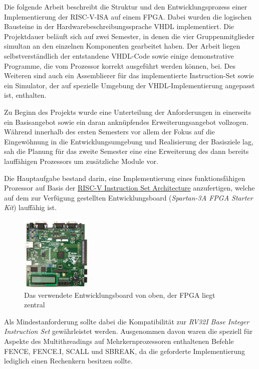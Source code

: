 
Die folgende Arbeit beschreibt die Struktur und den Entwicklungsprozess einer Implementierung
der RISC-V-ISA auf einem FPGA. Dabei wurden die logischen Bausteine in der
Hardwarebeschreibungssprache VHDL implementiert. Die Projektdauer beläuft sich auf zwei Semester, in denen
die vier Gruppenmitglieder simultan an den einzelnen Komponenten gearbeitet haben. Der Arbeit liegen selbstverst\"andlich der entstandene VHDL-Code sowie einige demonstrative Programme, die vom Prozessor korrekt ausgef\"uhrt werden k\"onnen, bei. Des Weiteren sind auch ein Assemblierer f\"ur das implementierte Instruction-Set sowie ein Simulator, der auf spezielle Umgebung der VHDL-Implementierung angepasst ist, enthalten.

\newpage


Zu Beginn des Projekts wurde eine Unterteilung der Anforderungen in einerseits ein Basisangebot sowie ein daran ankn\"upfendes Erweiterungsangebot vollzogen. W\"ahrend innerhalb des ersten Semesters vor allem der Fokus auf die Eingew\"ohnung in die Entwicklungsumgebung und Realisierung der Basisziele lag, sah die Planung f\"ur das zweite Semester eine eine Erweiterung des dann bereits lauff\"ahigen Prozessors um zus\"atzliche Module vor. 


Die Hauptaufgabe bestand darin, eine Implementierung eines funktionsf\"ahigen Prozessor auf Basis der \href{https://riscv.org/specifications/}{RISC-V Instruction Set Architecture} anzufertigen, welche auf dem zur Verf\"ugung gestellten Entwicklungsboard (\textit{Spartan-3A FPGA Starter Kit}) lauff\"ahig ist.
\begin{figure}[H]
	\centering
		\includegraphics[width=0.3\textwidth]{Board.png}
	\caption{Das verwendete Entwicklungsboard von oben, der FPGA liegt zentral}
	\label{fig:board}
\end{figure}


Als Mindestanforderung sollte dabei die Kompatibilit\"at zur \textit{RV32I Base Integer Instruction Set} gew\"ahrleistet werden. Ausgenommen davon waren die speziell f\"ur Aspekte des Multithreadings auf Mehrkernprozessoren enthaltenen Befehle FENCE, FENCE.I, SCALL und SBREAK, da die geforderte Implementierung lediglich einen Rechenkern besitzen sollte.

